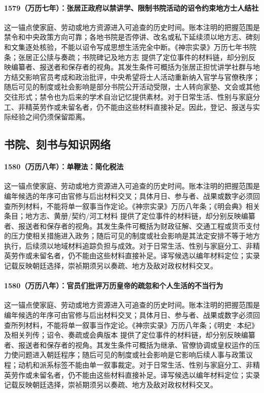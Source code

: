 \paragraph{1579（万历七年）：张居正政府以禁讲学、限制书院活动的诏令约束地方士人结社} 这一锚点使家庭、劳动或地方资源进入可追查的历史时间。账本注明的把握范围是禁令和中央政策方向可靠；各地书院是否停讲、改名或私下延续须以地方志、碑刻和文集逐处核验，不能以诏令写成思想生活完全中断。《神宗实录》万历七年书院条；张居正公牍与奏疏；书院碑记及地方志 提供了定位事件的材料链，却分别反映编纂者、报送者和保存者的视角。其发生条件可概括为张居正担忧讲学社群与地方结交影响官员考成和政治批评，中央希望将士人活动重新纳入官学与官僚秩序；随后可见的制度或社会影响是部分书院公开活动受限，士人转向家塾、文会或其他交往形式；禁令也为后来的学术自治记忆提供素材。对于日常生活、性别与家庭分工、非精英劳作或未留名者，仍不能由这些材料直接补足。因此，登记、报送与实际经验之间仍须保留距离。

\subsection{书院、刻书与知识网络}

\paragraph{1580（万历八年）：单鞭法：简化税法} 这一锚点使家庭、劳动或地方资源进入可追查的历史时间。账本注明的把握范围是编年候选的年序可由官修与后出材料交叉；具体月日、参与者、战果或数字必须回查所列材料，不能将单一叙事当作定论。《神宗实录》万历八年条；《明会典》相关条目；地方志、黄册/契约/河工材料 提供了定位事件的材料链，却分别反映编纂者、报送者和保存者的视角。其发生条件可概括为财政征解、交通工程或货币支付的压力使相关措施进入政务；随后可见的制度或社会影响是其法定安排不等于地方执行，后续须以地域材料追踪负担与成效。对于日常生活、性别与家庭分工、非精英劳作或未留名者，仍不能由这些材料直接补足。译写候选以编年材料定位；实录记载反映朝廷选择，崇祯期须另以奏疏、地方及敌对政权材料交叉。

\paragraph{1580（万历八年）：官员们批评万历皇帝的疏忽和个人生活的不当行为} 这一锚点使家庭、劳动或地方资源进入可追查的历史时间。账本注明的把握范围是编年候选的年序可由官修与后出材料交叉；具体月日、参与者、战果或数字必须回查所列材料，不能将单一叙事当作定论。《神宗实录》万历八年条；《明史·本纪》及相关列传；诏令、奏疏或会典版本 提供了定位事件的材料链，却分别反映编纂者、报送者和保存者的视角。其发生条件可概括为继承、官僚协调或皇权运作的压力使问题进入朝廷程序；随后可见的制度或社会影响是它影响后续人事与政策议程；动机和派系标签不能由单一叙事裁定。对于日常生活、性别与家庭分工、非精英劳作或未留名者，仍不能由这些材料直接补足。译写候选以编年材料定位；实录记载反映朝廷选择，崇祯期须另以奏疏、地方及敌对政权材料交叉。

